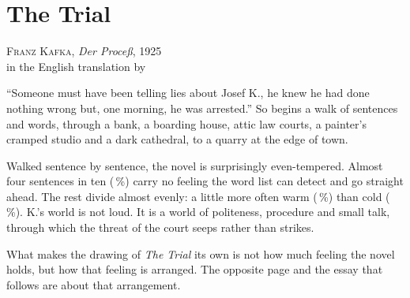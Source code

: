 
\graphicspath{{../build/the-trial/}}
\newcommand\strip[2]{%
  \begin{tikzpicture}
  \begin{axis}[width=40mm, height=21mm, scale only axis=false, ymin=0, axis y line=none,
      xmin=\lab{bmin-#1}, xmax=\lab{bmax-#1}, enlarge x limits=0.06, xtick=\empty,
      title={#2}, title style={font=\figfont\scriptsize, yshift=-1.5mm}, clip=false]
    \addplot[const plot mark mid, black, line width=0.4pt] table {../build/the-trial/baseline-#1.dat};
    \draw[line width=1.1pt] (axis cs:\lab{raw-#1},0) -- (axis cs:\lab{raw-#1},\pgfkeysvalueof{/pgfplots/ymax});
  \end{axis}
  \end{tikzpicture}}

\chapter[The Trial]{The Trial}
\label{ch:trial}

\begin{center}\small
\textsc{Franz Kafka}, \emph{Der Proce\ss}, 1925\\
in the English translation by 
\end{center}

\bigskip
\noindent ``Someone must have been telling lies about Josef K., he knew he had
done nothing wrong but, one morning, he was arrested.'' So begins a walk of
 sentences and  words, through a bank, a boarding
house, attic law courts, a painter's cramped studio and a dark cathedral, to a
quarry at the edge of town.

Walked sentence by sentence, the novel is surprisingly even-tempered. Almost
four sentences in ten (\,\%) carry no feeling the word
list can detect and go straight ahead. The rest divide almost evenly: a little
more often warm (\,\%) than cold
(\,\%). K.'s world is not loud. It is a world of
politeness, procedure and small talk, through which the threat of the court
seeps rather than strikes.

What makes the drawing of \emph{The Trial} its own is not how much feeling the
novel holds, but how that feeling is arranged. The opposite page and the essay
that follows are about that arrangement.

